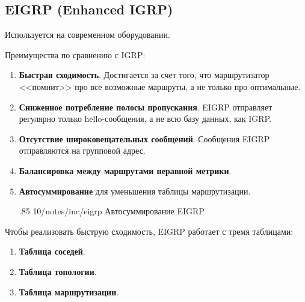 \subsection{EIGRP (Enhanced IGRP)}

Используется на современном оборудовании.

Преимущества по сравнению с IGRP:

\begin{enumerate}
    \item \textbf{Быстрая сходимость}. Достигается за счет того, что маршрутизатор <<помнит>> про все возможные маршруты, а не только про оптимальные.
    \item \textbf{Сниженное потребление полосы пропускания}. EIGRP отправляет регулярно только hello-сообщения, а не всю базу данных, как IGRP.
    \item \textbf{Отсутствие широковещательных сообщений}. Сообщения EIGRP отправляются на групповой адрес.
    \item \textbf{Балансировка между маршрутами неравной метрики}.
    \item \textbf{Автосуммирование} для уменьшения таблицы маршрутизации.

          \image
          {.85\linewidth}
          {10/notes/inc/eigrp}
          {Автосуммирование EIGRP}
\end{enumerate}

Чтобы реализовать быструю сходимость, EIGRP работает с тремя таблицами:

\begin{enumerate}
    \item \textbf{Таблица соседей}.
    \item \textbf{Таблица топологии}.
    \item \textbf{Таблица маршрутизации}.
\end{enumerate}